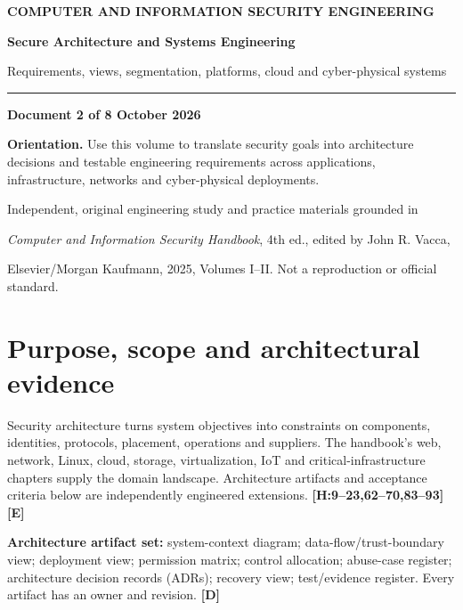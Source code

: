 \documentclass[10pt,letterpaper,oneside]{article}
\newcommand{\handbookref}[1]{\textsf{\color{accent}\textbf{[H:#1]}}}
\newcommand{\modernext}{\textsf{\color{muted}\textbf{[E]}}}
\newcommand{\designed}{\textsf{\color{accent}\textbf{[D]}}}
\newcommand{\makereportcover}[4]{%
\hypersetup{pageanchor=false}%

\thispagestyle{empty}\vspace*{1.15in}
{\small\bfseries\color{accent} COMPUTER AND INFORMATION SECURITY ENGINEERING}\par\vspace{13pt}
{\Huge\bfseries\color{ink} #1\par}\vspace{15pt}
{\Large\color{muted} #2\par}\vspace{18pt}
\color{accent}\rule{0.94\textwidth}{2.1pt}\par\vspace{20pt}
{\normalsize\bfseries Document #3 of 8 \quad\textbullet\quad 16 October 2026\par}
\vspace{0.35in}
\begin{sourcebox}\textbf{Orientation.} #4\end{sourcebox}
\vfill
{\small\color{muted} Independent, original engineering study and practice materials grounded in\par
\emph{Computer and Information Security Handbook}, 4th ed., edited by John R. Vacca,\par
Elsevier/Morgan Kaufmann, 2025, Volumes I--II. Not a reproduction or official standard.}
\newpage\hypersetup{pageanchor=true}\setcounter{page}{1}\tableofcontents\newpage
}
\begin{document}
\makereportcover{Secure Architecture and Systems Engineering}{Requirements, views, segmentation, platforms, cloud and cyber-physical systems}{2}{Use this volume to translate security goals into architecture decisions and testable engineering requirements across applications, infrastructure, networks and cyber-physical deployments.}

\section{Purpose, scope and architectural evidence}
Security architecture turns system objectives into constraints on components, identities, protocols, placement, operations and suppliers. The handbook's web, network, Linux, cloud, storage, virtualization, IoT and critical-infrastructure chapters supply the domain landscape. Architecture artifacts and acceptance criteria below are independently engineered extensions. \handbookref{9--23,62--70,83--93} \modernext{}
\begin{sourcebox}\textbf{Architecture artifact set:} system-context diagram; data-flow/trust-boundary view; deployment view; permission matrix; control allocation; abuse-case register; architecture decision records (ADRs); recovery view; test/evidence register. Every artifact has an owner and revision. \designed{}\end{sourcebox}
\end{document}
